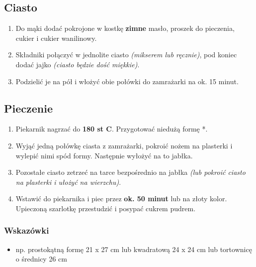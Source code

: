 \documentclass[11pt, a4paper, titlepage]{article}
\begin{document}
\subsection{Ciasto}
\begin{enumerate}
\item Do mąki dodać pokrojone w kostkę \textbf{zimne} masło, proszek do pieczenia, cukier i cukier wanilinowy.
\item Składniki połączyć w jednolite ciasto \textit{(mikserem lub ręcznie)}, pod koniec dodać jajko \textit{(ciasto będzie dość miękkie)}.
\item Podzielić je na pół i włożyć obie połówki do zamrażarki na ok. 15 minut.
\end{enumerate}

\subsection{Pieczenie}
\begin{enumerate}
\item Piekarnik nagrzać do \textbf{180 st C}. Przygotować niedużą formę *.
\item Wyjąć jedną połówkę ciasta z zamrażarki, pokroić nożem na plasterki i wylepić nimi spód formy. Następnie wyłożyć na to jabłka.
\item Pozostałe ciasto zetrzeć na tarce bezpośrednio na jabłka \textit{(lub pokroić ciasto na plasterki i ułożyć na wierzchu)}.
\item Wstawić do piekarnika i piec przez \textbf{ok. 50 minut} lub na złoty kolor. Upieczoną szarlotkę przestudzić i posypać cukrem pudrem.
\end{enumerate}

\subsubsection{Wskazówki}
\begin{itemize}
\item {\fontsize{9pt}{\baselineskip}\selectfont np. prostokątną formę 21 x 27 cm lub kwadratową 24 x 24 cm lub tortownicę o średnicy 26 cm}\par
\end{itemize}
\end{document}

